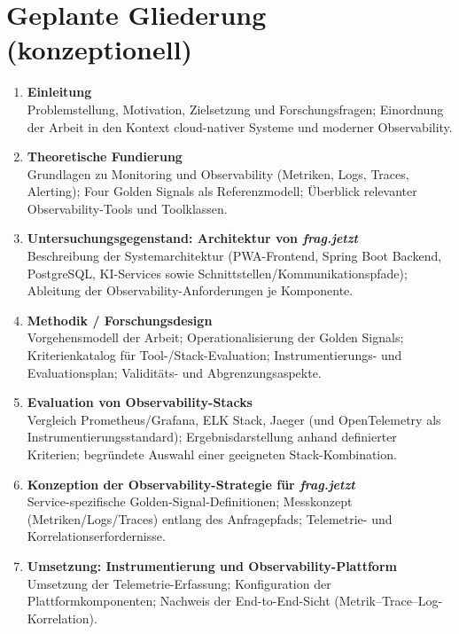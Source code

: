 \section{Geplante Gliederung (konzeptionell)}

\begin{enumerate}
  \item \textbf{Einleitung} \\
  Problemstellung, Motivation, Zielsetzung und Forschungsfragen; Einordnung der Arbeit in den Kontext cloud-nativer Systeme und moderner Observability.

  \item \textbf{Theoretische Fundierung} \\
  Grundlagen zu Monitoring und Observability (Metriken, Logs, Traces, Alerting); Four Golden Signals als Referenzmodell; Überblick relevanter Observability-Tools und Toolklassen.

  \item \textbf{Untersuchungsgegenstand: Architektur von \emph{frag.jetzt}} \\
  Beschreibung der Systemarchitektur (PWA-Frontend, Spring Boot Backend, PostgreSQL, KI-Services sowie Schnittstellen/Kommunikationspfade); Ableitung der Observability-Anforderungen je Komponente.

  \item \textbf{Methodik / Forschungsdesign} \\
  Vorgehensmodell der Arbeit; Operationalisierung der Golden Signals; Kriterienkatalog für Tool-/Stack-Evaluation; Instrumentierungs- und Evaluationsplan; Validitäts- und Abgrenzungsaspekte.

  \item \textbf{Evaluation von Observability-Stacks} \\
  Vergleich Prometheus/Grafana, ELK Stack, Jaeger (und OpenTelemetry als Instrumentierungsstandard); Ergebnisdarstellung anhand definierter Kriterien; begründete Auswahl einer geeigneten Stack-Kombination.

  \item \textbf{Konzeption der Observability-Strategie für \emph{frag.jetzt}} \\
  Service-spezifische Golden-Signal-Definitionen; Messkonzept (Metriken/Logs/Traces) entlang des Anfragepfads; Telemetrie- und Korrelationserfordernisse.

  \item \textbf{Umsetzung: Instrumentierung und Observability-Plattform} \\
  Umsetzung der Telemetrie-Erfassung; Konfiguration der Plattformkomponenten; Nachweis der End-to-End-Sicht (Metrik–Trace–Log-Korrelation).


\end{enumerate}
